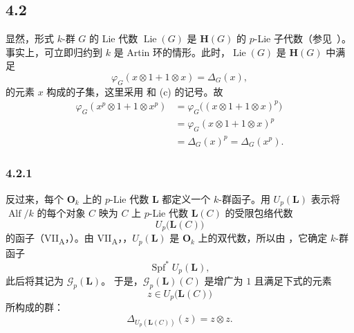 
\subsection*{4.2}
\label{sga3:VIIB:4.2}
显然，形式 \(k\)-群 \(G\) 的 Lie 代数 \(\operatorname{Lie}(G)\) 是 \(\mathbf H(G)\) 的 \(p\)-Lie 子代数\textup{（参见\ ）}。事实上，可立即归约到 \(k\) 是 Artin 环的情形。此时，\(\operatorname{Lie}(G)\) 是 \(\mathbf H(G)\) 中满足
\[
  \varphi_G(x\otimes1+1\otimes x)=\Delta_G(x),
\]
的元素 \(x\) 构成的子集，这里采用  和 \textup{(c)} 的记号。故
\[
\begin{aligned}
  \varphi_G(x^p\otimes1+1\otimes x^p)
  &=
  \varphi_G\bigl((x\otimes1+1\otimes x)^p\bigr)
  \\
  &=
  \varphi_G(x\otimes1+1\otimes x)^p
  \\
  &=
  \Delta_G(x)^p
  =
  \Delta_G(x^p).
\end{aligned}
\]
\subsubsection*{4.2.1}
\label{sga3:VIIB:4.2.1}
反过来，每个 \(\mathbf O_k\) 上的 \(p\)-Lie 代数 \(\mathbf L\) 都定义一个 \(k\)-群函子。用 \(U_p(\mathbf L)\) 表示将 \(\operatorname{Alf}/k\) 的每个对象 \(C\) 映为 \(C\) 上 \(p\)-Lie 代数 \(\mathbf L(C)\) 的受限包络代数
\[
  U_p\bigl(\mathbf L(C)\bigr)
\]
的函子\textup{（VII\textsubscript{A}，）}。由 VII\textsubscript{A}，，\(U_p(\mathbf L)\) 是 \(\mathbf O_k\) 上的双代数，所以由 ，它确定 \(k\)-群函子
\[
  \operatorname{Spf}^{*}U_p(\mathbf L),
\]
此后将其记为 \(\mathscr G_p(\mathbf L)\)。
于是，\(\mathscr G_p(\mathbf L)(C)\) 是增广为 \(1\) 且满足下式的元素
\[
  z\in U_p\bigl(\mathbf L(C)\bigr)
\]
所构成的群：
\[
  \Delta_{U_p(\mathbf L(C))}(z)=z\otimes z.
\]


